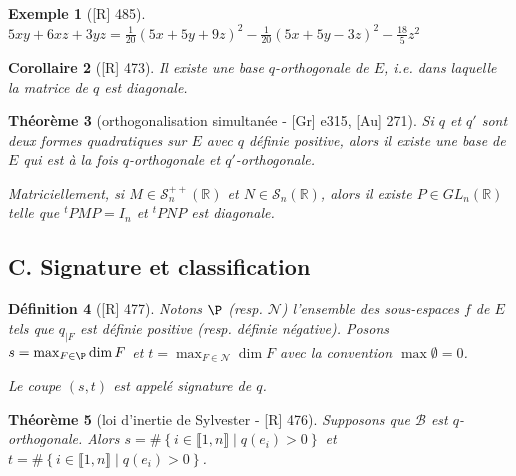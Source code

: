 \documentclass[10pt, a4paper, parskip=full, twoside, twocolumn]{report}
\newtheorem{definition}{Définition}
\newtheorem{theorem}[definition]{Théorème}
\newtheorem{corollary}[definition]{Corollaire}
\newtheorem{example}[definition]{Exemple}
\newcommand{\IR}{\mathbb{R}}
\newcommand{\B}{\mathcal{B}}
\begin{document}
\begin{example}[\textnormal{[R] 485}]
	$5xy+6xz+3yz = \frac{1}{20}(5x+5y+9z)^2 - \frac{1}{20}(5x+5y-3z)^2 - \frac{18}{5}z^2$
\end{example}

\begin{corollary}[\textnormal{[R] 473}]
	Il existe une base $q$-orthogonale de $E$, \emph{i.e.} dans laquelle la matrice de $q$ est diagonale.
\end{corollary}

\begin{theorem}[orthogonalisation simultanée - \textnormal{[Gr] e315, [Au] 271}]
	Si $q$ et $q'$ sont deux formes quadratiques sur $E$ avec $q$ définie positive, alors il existe une base de $E$ qui est à la fois $q$-orthogonale et $q'$-orthogonale.

	Matriciellement, si $M\in\mathcal{S}_n^{++}(\IR)$ et $N\in\mathcal{S}_n(\IR)$, alors il existe $P\in GL_n(\IR)$ telle que 
	${}^tPMP = I_n$ et ${}^tPNP$ est diagonale.
\end{theorem}

\subsection*{C. Signature et classification}
\begin{definition}[\textnormal{[R] 477}]
	Notons $\P$ (resp. $\mathcal{N}$) l'ensemble des sous-espaces $f$ de $E$ tels que $q_{\mid F}$ est définie positive (resp. définie négative).
	Posons $s = \max_{F\in\P} \dim F$ et $t = \max_{F\in\mathcal{N}} \dim F$ avec la convention $\max \emptyset = 0$.

	Le coupe $(s,t)$ est appelé \emph{signature de $q$}.
\end{definition}

\begin{tcolorbox}[
    breakable, %
    colback=developpement, %
    colframe=gray!0!black, %
    boxrule=0pt, %
    arc=1mm, %
	boxsep=0pt,
	left=0pt, right=0pt, top=0pt, bottom=0pt
]
\begin{theorem}[loi d'inertie de Sylvester - \textnormal{[R] 476}]
	\label{171dev1}
	Supposons que $\B$ est $q$-orthogonale.
	Alors $s = \#\left\{i\in \llbracket 1,n\rrbracket \mid q(e_i)> 0\right\}$
	et $t=\#\left\{i\in \llbracket 1,n \rrbracket \mid q(e_i) > 0\right\}$.
\end{theorem}
\end{tcolorbox}
\end{document}
